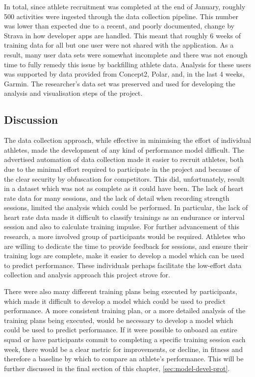 In total, since athlete recruitment was completed at the end of January, roughly 500 activities were ingested through the data collection pipeline. This number was lower than expected due to a recent, and poorly documented, change by Strava in how developer apps are handled. This meant that roughly 6 weeks of training data for all but one user were not shared with the application. As a result, many user data sets were somewhat incomplete and there was not enough time to fully remedy this issue by backfilling athlete data. Analysis for these users was supported by data provided from Concept2, Polar, and, in the last 4 weeks, Garmin. The researcher's data set was preserved and used for developing the analysis and visualisation steps of the project.

\subsection{Discussion}
The data collection approach, while effective in minimising the effort of individual athletes, made the development of any kind of performance model difficult. The advertised automation of data collection made it easier to recruit athletes, both due to the minimal effort required to participate in the project and because of the clear security by obfuscation for competitors. This did, unfortunately, result in a dataset which was not as complete as it could have been. The lack of heart rate data for many sessions, and the lack of detail when recording strength sessions, limited the analysis which could be performed. In particular, the lack of heart rate data made it difficult to classify trainings as an endurance or interval session and also to calculate training impulse. For further advancement of this research, a more involved group of participants would be required. Athletes who are willing to dedicate the time to provide feedback for sessions, and ensure their training logs are complete, make it easier to develop a model which can be used to predict performance. These individuals perhaps facilitate the low-effort data collection and analysis approach this project strove for. 

There were also many different training plans being executed by participants, which made it difficult to develop a model which could be used to predict performance. A more consistent training plan, or a more detailed analysis of the training plans being executed, would be necessary to develop a model which could be used to predict performance. If it were possible to onboard an entire squad or have participants commit to completing a specific training session each week, there would be a clear metric for improvements, or decline, in fitness and therefore a baseline by which to compare an athlete's performance. This will be further discussed in the final section of this chapter, \autoref{sec:model-devel-prot}.

